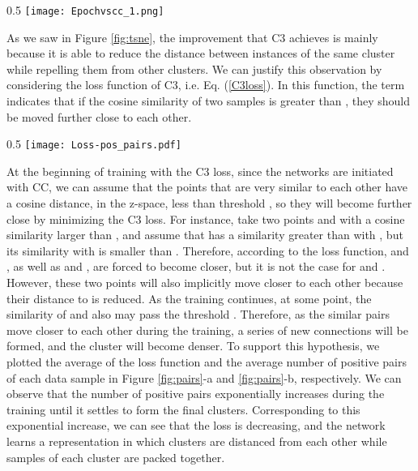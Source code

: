 \documentclass{bmvc2k}
\newcommand{\shadow}[1]{}
\newcommand{\red}[1]{\textcolor{red}{#1}}
\def\s{\shadow}
\def\r{\red}
\begin{document}
\begin{wrapfigure}[]{}{0.5\textwidth}
\vspace{-9mm}
    \centering
    \texttt{[image: Epochvscc\_1.png]}
    \vspace{-5mm}
    \caption{Performance of CC and C3 after 1020 epochs.}
    \label{fig:vscc}
\end{wrapfigure}

As we saw in Figure \ref{fig:tsne}, the improvement that C3 achieves is mainly because it is able to reduce the distance between instances of the same cluster while repelling them from other clusters. We can justify this observation by considering the loss function of C3, i.e. Eq. (\ref{C3loss}). In this function, the term  indicates that if the cosine similarity of two samples is greater than , they should be moved further close to each other.
\begin{wrapfigure}[9]{}{0.5\textwidth}
  \centering
  \vspace{-6mm}
  \texttt{[image: Loss-pos\_pairs.pdf]}
  \caption{Plot of loss and number of positive pairs versus epoch.}
  \vspace{-4mm}
  \label{fig:pairs}
\end{wrapfigure}
At the beginning of training with the C3 loss, since the networks are initiated with CC,\s{, since the z-space is initiated with the \r{THIS PARAGRAPH NEEDS REVISION}CC obtained z-space,} we can assume that the points that are very similar to each other have a cosine distance, in the z-space, less than threshold , so they will become further close by minimizing the C3 loss. For instance, take two points  and  with a cosine similarity larger than , and assume that  has a similarity greater than  with , but its similarity with  is smaller than . Therefore, according to the loss function,  and , as well as  and , are forced to become closer, but it is not the case for  and . However, these two points will also implicitly move closer to each other because their distance to  is reduced. As the training continues, at some point, the similarity of  and  also may pass the threshold . Therefore, as the similar pairs move closer to each other during the training, a series of new connections will be formed, and the cluster will become denser. To support this hypothesis, we plotted the average of the loss function and the average number of positive pairs of each data sample in Figure \ref{fig:pairs}-a and \ref{fig:pairs}-b, respectively. We can observe that the number of positive pairs exponentially increases during the training until it settles to form the final clusters. Corresponding to this exponential increase, we can see that the loss is decreasing, and the network learns a representation in which clusters are distanced from each other while samples of each cluster are packed together.
\end{document}

